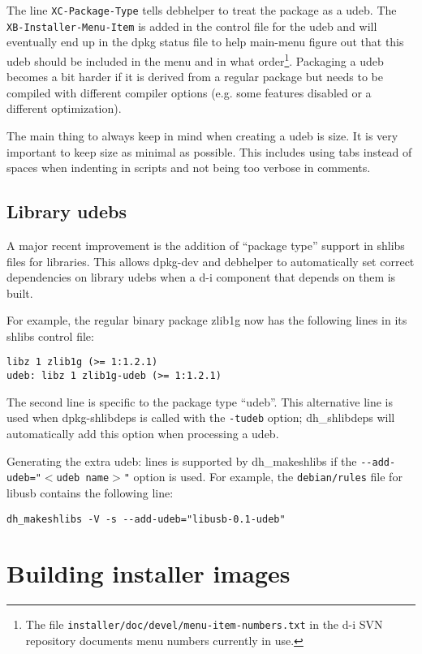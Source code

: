\documentclass[a4paper,10pt]{article}
\begin{document}
The line \texttt{XC-Package-Type} tells debhelper to treat the package as a udeb. The \texttt{XB-Installer-Menu-Item} is added in the control file for the udeb and will eventually end up in the dpkg status file to help main-menu figure out that this udeb should be included in the menu and in what order\footnote{The file \texttt{installer/doc/devel/menu-item-numbers.txt} in the d-i SVN repository documents menu numbers currently in use.}. Packaging a udeb becomes a bit harder if it is derived from a regular package but needs to be compiled with different compiler options (e.g. some features disabled or a different optimization). 

The main thing to always keep in mind when creating a udeb is size. It is very important to keep size as minimal as possible. This includes using tabs instead of spaces when indenting in scripts and not being too verbose in comments. 


\subsection{Library udebs}
A major recent improvement is the addition of “package type” support in shlibs files for libraries. This allows dpkg-dev and debhelper to automatically set correct dependencies on library udebs when a d-i component that depends on them is built. 

For example, the regular binary package zlib1g now has the following lines in its shlibs control file:

\begin{verbatim}
libz 1 zlib1g (>= 1:1.2.1)
udeb: libz 1 zlib1g-udeb (>= 1:1.2.1)
\end{verbatim}

The second line is specific to the package type “udeb”. This alternative line is used when dpkg-shlibdeps is called with the \texttt{-tudeb} option; dh\_shlibdeps will automatically add this option when processing a udeb. 

Generating the extra udeb: lines is supported by dh\_makeshlibs if the \texttt{{-}{-}add-udeb="$<$udeb name$>$"} option is used. For example, the \texttt{debian/rules} file for libusb contains the following line: 

\begin{verbatim}
dh_makeshlibs -V -s --add-udeb="libusb-0.1-udeb"
\end{verbatim}


\section{Building installer images}
\end{document}
